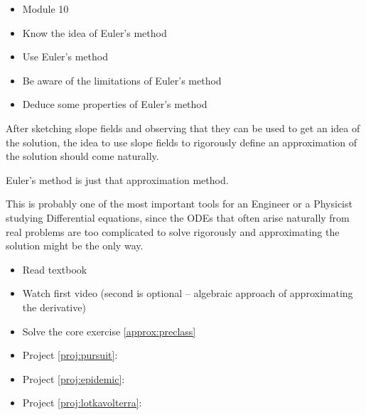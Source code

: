 \begin{lesson}


	\begin{itemize}
		\item Module 10
	\end{itemize}

	\begin{itemize}
		\item Know the idea of Euler's method
		\item Use Euler's method
		\item Be aware of the limitations of Euler's method
		\item Deduce some properties of Euler's method
	\end{itemize}
	

After sketching slope fields and observing that they can be used to get an idea of the solution, the idea to use slope fields to rigorously define an approximation of the solution should come naturally.

Euler's method is just that approximation method. 

This is probably one of the most important tools for an Engineer or a Physicist studying Differential equations, since the ODEs that often arise naturally from real problems are too complicated to solve rigorously and approximating the solution might be the only way.


\begin{itemize}
	\item Read textbook
	\item Watch first video (second is optional -- algebraic approach of approximating the derivative)
	\item Solve the core exercise \ref{approx:preclass}
\end{itemize}

\begin{itemize}
	\item Project \ref{proj:pursuit}: \pursuittitle
	\item Project \ref{proj:epidemic}: \epidemictitle
	\item Project \ref{proj:lotkavolterra}: \lotkavolterratitle
\end{itemize}


\end{lesson}



